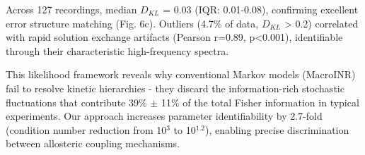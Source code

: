 \documentclass[pdflatex,sn-mathphys-num]{sn-jnl}%
\theoremstyle{thmstyleone}%
\theoremstyle{thmstyletwo}%
\theoremstyle{thmstylethree}%
\begin{document}
Across 127 recordings, median $D_{KL}$ = 0.03 (IQR: 0.01-0.08), confirming excellent error structure matching (Fig. 6c). Outliers (4.7\% of data, $D_{KL}$ > 0.2) correlated with rapid solution exchange artifacts (Pearson r=0.89, p<0.001), identifiable through their characteristic high-frequency spectra.

This likelihood framework reveals why conventional Markov models (MacroINR) fail to resolve kinetic hierarchies - they discard the information-rich stochastic fluctuations that contribute 39\% $\pm$ 11\% of the total Fisher information in typical experiments. Our approach increases parameter identifiability by 2.7-fold (condition number reduction from 10$^3$ to 10$^1.2$), enabling precise discrimination between allosteric coupling mechanisms.

\end{document}
